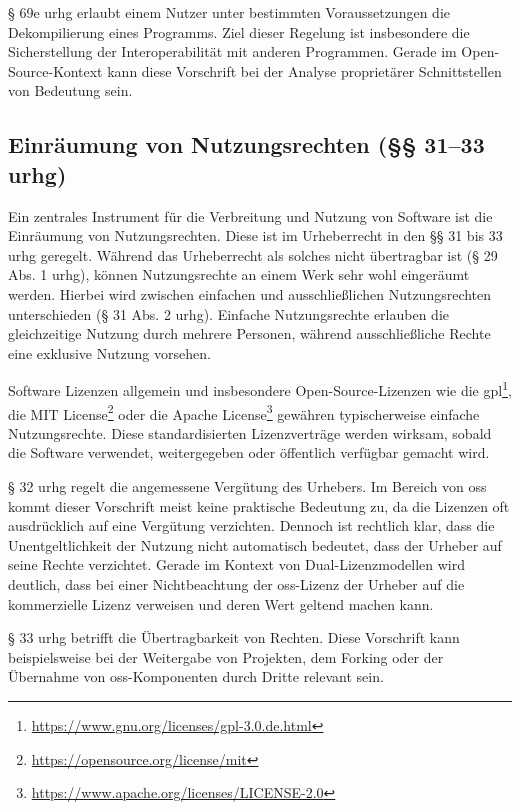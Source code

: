 § 69e \gls{urhg} erlaubt einem Nutzer unter bestimmten Voraussetzungen die Dekompilierung eines Programms.
Ziel dieser Regelung ist insbesondere die Sicherstellung der Interoperabilität mit anderen Programmen.
Gerade im Open-Source-Kontext kann diese Vorschrift bei der Analyse proprietärer Schnittstellen von Bedeutung sein.


\subsection{Einräumung von Nutzungsrechten (§§ 31–33 \gls{urhg})}

Ein zentrales Instrument für die Verbreitung und Nutzung von Software ist die Einräumung von Nutzungsrechten.
Diese ist im Urheberrecht in den §§ 31 bis 33 \gls{urhg} geregelt.
Während das Urheberrecht als solches nicht übertragbar ist (§ 29 Abs. 1 \gls{urhg}), können Nutzungsrechte an einem Werk sehr wohl eingeräumt werden.
Hierbei wird zwischen einfachen und ausschließlichen Nutzungsrechten unterschieden (§ 31 Abs. 2 \gls{urhg}).
Einfache Nutzungsrechte erlauben die gleichzeitige Nutzung durch mehrere Personen, während ausschließliche Rechte eine exklusive Nutzung vorsehen.

Software Lizenzen allgemein und insbesondere Open-Source-Lizenzen wie die \gls{gpl}\footnote{\url{https://www.gnu.org/licenses/gpl-3.0.de.html}}, die MIT License\footnote{\url{https://opensource.org/license/mit}} oder die Apache
License\footnote{\url{https://www.apache.org/licenses/LICENSE-2.0}} gewähren typischerweise einfache Nutzungsrechte.
Diese standardisierten Lizenzverträge werden wirksam, sobald die Software verwendet, weitergegeben oder öffentlich verfügbar gemacht wird.

§ 32 \gls{urhg} regelt die angemessene Vergütung des Urhebers.
Im Bereich von \gls{oss} kommt dieser Vorschrift meist keine praktische Bedeutung zu, da die Lizenzen oft ausdrücklich auf eine Vergütung verzichten.
Dennoch ist rechtlich klar, dass die Unentgeltlichkeit der Nutzung nicht automatisch bedeutet, dass der Urheber auf seine Rechte verzichtet.
Gerade im Kontext von Dual-Lizenzmodellen wird deutlich, dass bei einer Nichtbeachtung der \gls{oss}-Lizenz der Urheber auf die kommerzielle Lizenz verweisen und deren Wert geltend machen kann.

§ 33 \gls{urhg} betrifft die Übertragbarkeit von Rechten.
Diese Vorschrift kann beispielsweise bei der Weitergabe von Projekten, dem Forking oder der Übernahme von \gls{oss}-Komponenten durch Dritte relevant sein.

